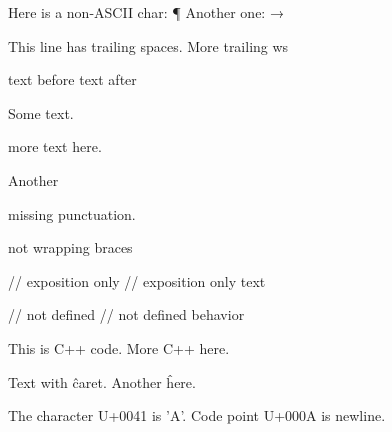 Here is a non-ASCII char: ¶
Another one: →

This line has trailing spaces.   
More trailing ws  

 \begin{codeblock}
 \end{codeblock}

text before \pnum
\pnum text after

\pnum
\pnum
\pnum

\begin{footnote}Some text.\end{footnote}more text here.
\begin{footnote}Another\end{footnote}missing punctuation.

\opt not wrapping braces
\opt{}

// exposition only
// exposition only text

// not defined
// not defined behavior

This is C++ code.
More C++ here.

Text with \^ caret.
Another \^ here.

The character U+0041 is 'A'.
Code point U+000A is newline.




